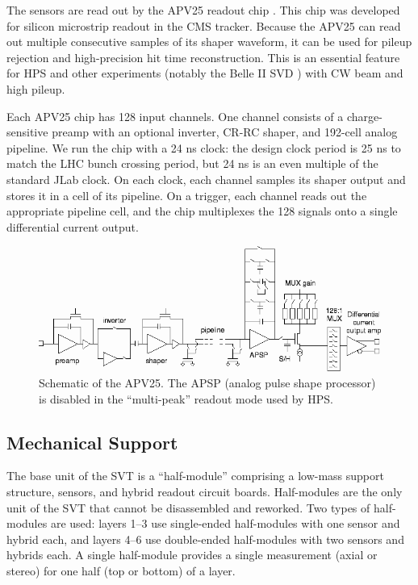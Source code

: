 The sensors are read out by the APV25 readout chip \cite{french_design_2001}.
This chip was developed for silicon microstrip readout in the CMS tracker.
Because the APV25 can read out multiple consecutive samples of its shaper waveform, it can be used for pileup rejection and high-precision hit time reconstruction.
This is an essential feature for HPS and other experiments (notably the Belle II SVD \cite{liu_belle_2012}) with CW beam and high pileup.

Each APV25 chip has 128 input channels.
One channel consists of a charge-sensitive preamp with an optional inverter, CR-RC shaper, and 192-cell analog pipeline.
We run the chip with a 24 ns clock: the design clock period is 25 ns to match the LHC bunch crossing period, but 24 ns is an even multiple of the standard JLab clock.
On each clock, each channel samples its shaper output and stores it in a cell of its pipeline.
On a trigger, each channel reads out the appropriate pipeline cell, and the chip multiplexes the 128 signals onto a single differential current output.

\begin{figure}[ht]
    \includegraphics[width=\textwidth]{detector/figs/apv25}
    \caption{Schematic of the APV25. The APSP (analog pulse shape processor) is disabled in the ``multi-peak'' readout mode used by HPS.}
    \label{fig:apv25}
\end{figure}


\subsection{Mechanical Support}
The base unit of the SVT is a ``half-module'' comprising a low-mass support structure, sensors, and hybrid readout circuit boards.
Half-modules are the only unit of the SVT that cannot be disassembled and reworked.
Two types of half-modules are used: layers 1--3 use single-ended half-modules with one sensor and hybrid each, and layers 4--6 use double-ended half-modules with two sensors and hybrids each.
A single half-module provides a single measurement (axial or stereo) for one half (top or bottom) of a layer.


